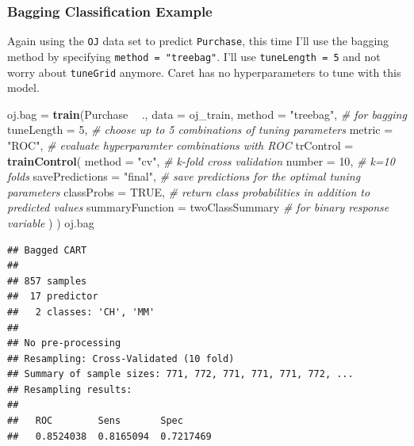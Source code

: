 \documentclass[
]{book}
\newenvironment{Shaded}{\begin{snugshade}}{\end{snugshade}}
\newcommand{\CommentTok}[1]{\textcolor[rgb]{0.56,0.35,0.01}{\textit{#1}}}
\newcommand{\DataTypeTok}[1]{\textcolor[rgb]{0.13,0.29,0.53}{#1}}
\newcommand{\DecValTok}[1]{\textcolor[rgb]{0.00,0.00,0.81}{#1}}
\newcommand{\KeywordTok}[1]{\textcolor[rgb]{0.13,0.29,0.53}{\textbf{#1}}}
\newcommand{\NormalTok}[1]{#1}
\newcommand{\OperatorTok}[1]{\textcolor[rgb]{0.81,0.36,0.00}{\textbf{#1}}}
\newcommand{\OtherTok}[1]{\textcolor[rgb]{0.56,0.35,0.01}{#1}}
\newcommand{\StringTok}[1]{\textcolor[rgb]{0.31,0.60,0.02}{#1}}
\begin{document}
\hypertarget{bagging-classification-example}{%
\subsubsection{Bagging Classification Example}\label{bagging-classification-example}}

Again using the \texttt{OJ} data set to predict \texttt{Purchase}, this time I'll use the bagging method by specifying \texttt{method\ =\ "treebag"}. I'll use \texttt{tuneLength\ =\ 5} and not worry about \texttt{tuneGrid} anymore. Caret has no hyperparameters to tune with this model.

\begin{Shaded}
\begin{Highlighting}[]
\NormalTok{oj.bag =}\StringTok{ }\KeywordTok{train}\NormalTok{(Purchase }\OperatorTok{~}\StringTok{ }\NormalTok{., }
               \DataTypeTok{data =}\NormalTok{ oj_train, }
               \DataTypeTok{method =} \StringTok{"treebag"}\NormalTok{,  }\CommentTok{# for bagging}
               \DataTypeTok{tuneLength =} \DecValTok{5}\NormalTok{,  }\CommentTok{# choose up to 5 combinations of tuning parameters}
               \DataTypeTok{metric =} \StringTok{"ROC"}\NormalTok{,  }\CommentTok{# evaluate hyperparamter combinations with ROC}
               \DataTypeTok{trControl =} \KeywordTok{trainControl}\NormalTok{(}
                 \DataTypeTok{method =} \StringTok{"cv"}\NormalTok{,  }\CommentTok{# k-fold cross validation}
                 \DataTypeTok{number =} \DecValTok{10}\NormalTok{,  }\CommentTok{# k=10 folds}
                 \DataTypeTok{savePredictions =} \StringTok{"final"}\NormalTok{,       }\CommentTok{# save predictions for the optimal tuning parameters}
                      \DataTypeTok{classProbs =} \OtherTok{TRUE}\NormalTok{,  }\CommentTok{# return class probabilities in addition to predicted values}
                      \DataTypeTok{summaryFunction =}\NormalTok{ twoClassSummary  }\CommentTok{# for binary response variable}
\NormalTok{                      )}
\NormalTok{                    )}
\NormalTok{oj.bag}
\end{Highlighting}
\end{Shaded}

\begin{verbatim}
## Bagged CART 
## 
## 857 samples
##  17 predictor
##   2 classes: 'CH', 'MM' 
## 
## No pre-processing
## Resampling: Cross-Validated (10 fold) 
## Summary of sample sizes: 771, 772, 771, 771, 771, 772, ... 
## Resampling results:
## 
##   ROC        Sens       Spec     
##   0.8524038  0.8165094  0.7217469
\end{verbatim}
\end{document}
